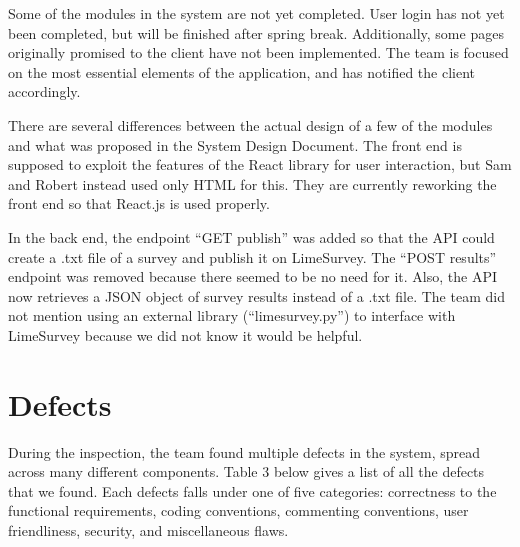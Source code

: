 \documentclass{article}
\begin{document}
Some of the modules in the system are not yet completed. User login has not yet been completed, but will be finished after spring break. Additionally, some pages originally promised to the client have not been implemented. The team is focused on the most essential elements of the application, and has notified the client accordingly. 

There are several differences between the actual design of a few of the modules and what was proposed in the System Design Document. The front end is supposed to exploit the features of the React library for user interaction, but Sam and Robert instead used only HTML for this. They are currently reworking the front end so that React.js is used properly.

In the back end, the endpoint ``GET publish'' was added so that the API could create a .txt file of a survey and publish it on LimeSurvey. The ``POST results'' endpoint was removed because there seemed to be no need for it. Also, the API now retrieves a JSON object of survey results instead of a .txt file. The team did not mention using an external library (``limesurvey.py'') to interface with LimeSurvey because we did not know it would be helpful.

\section{Defects}

During the inspection, the team found multiple defects in the system, spread across many different components. Table 3 below gives a list of all the defects that we found. Each defects falls under one of five categories: correctness to the functional requirements, coding conventions, commenting conventions, user friendliness, security, and miscellaneous flaws.
\end{document}
